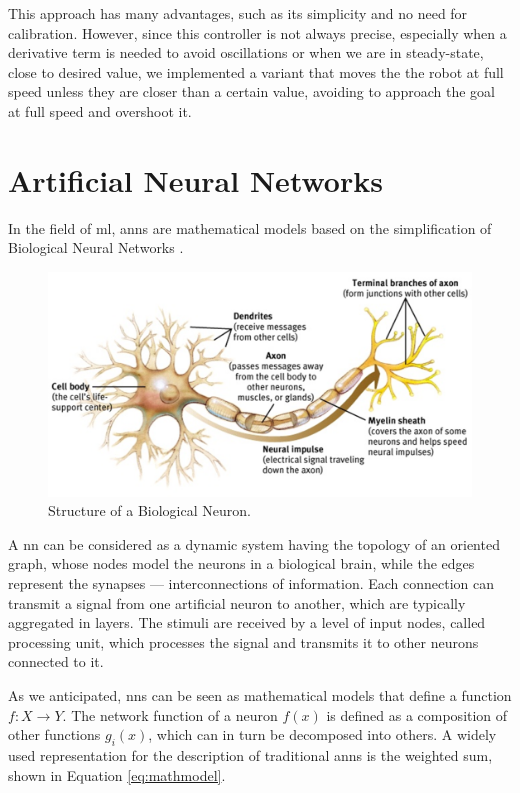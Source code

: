 This approach has many advantages, such as its simplicity and no need for 
calibration. 
However, since this controller is not always precise, especially when a derivative 
term is needed to avoid oscillations or when we are in steady-state, close to 
desired value, we implemented a variant that moves the the robot at full speed 
unless they are closer than a certain value, avoiding to approach the goal at full 
speed and overshoot it.

\section{Artificial Neural Networks}
\label{sec:nn}
In the field of \gls{ml}, \glspl{ann} are mathematical models based on the 
simplification of Biological Neural Networks \cite[][]{zou2008overview}. 

\begin{figure}[htb]
	\centering
	\includegraphics[width=.7\textwidth]{contents/images/Neuron}
	\caption{Structure of a Biological Neuron.}
	\label{fig:bioneuron}
\end{figure}

A \gls{nn} can be considered as a dynamic system having the topology of an 
oriented graph, whose nodes model the neurons in a biological brain, while the 
edges represent the synapses — interconnections of information.
Each connection can transmit a signal from one artificial neuron to another,
which are typically aggregated in layers. The stimuli are received by a level of 
input nodes, called processing unit, which processes the signal and transmits it to 
other neurons connected to it.

As we anticipated, \glspl{nn} can be seen as mathematical models that define a 
function $f : X \rightarrow Y$. 
The network function of a neuron $f(x)$ is defined as a composition of
other functions $g_i(x)$, which can in turn be decomposed into others.
A widely used representation for the description of traditional \glspl{ann} is the 
weighted sum, shown in Equation \ref{eq:mathmodel}.

